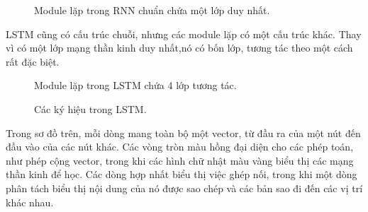 \begin{figure}[H]
    \caption{\label{fig:lstm3-simpleRNN} Module lặp trong RNN chuẩn chứa một lớp duy nhất.}
\end{figure}

LSTM cũng có cấu trúc chuỗi, nhưng các module lặp có một cấu trúc khác. Thay vì có một lớp
mạng thần kinh duy nhất,nó có bốn lớp, tương tác theo một cách rất đặc biệt.

\begin{figure}[H]
    \caption{\label{fig:lstm3-chain} Module lặp trong LSTM chứa 4 lớp tương tác.}
\end{figure}

\begin{figure}[H]
    \caption{\label{fig:lstm2-notation} Các ký hiệu trong LSTM.}
\end{figure}

Trong sơ đồ trên, mỗi dòng mang toàn bộ một vector, từ đầu ra của một nút đến đầu vào của các nút khác. Các vòng tròn
màu hồng đại diện cho các phép toán, như phép cộng vector, trong khi các hình chữ nhật màu vàng biểu thị các mạng
thần kinh để học. Các dòng hợp nhất biểu thị việc ghép nối, trong khi một dòng phân tách biểu thị nội dung của nó được
sao chép và các bản sao đi đến các vị trí khác nhau.

